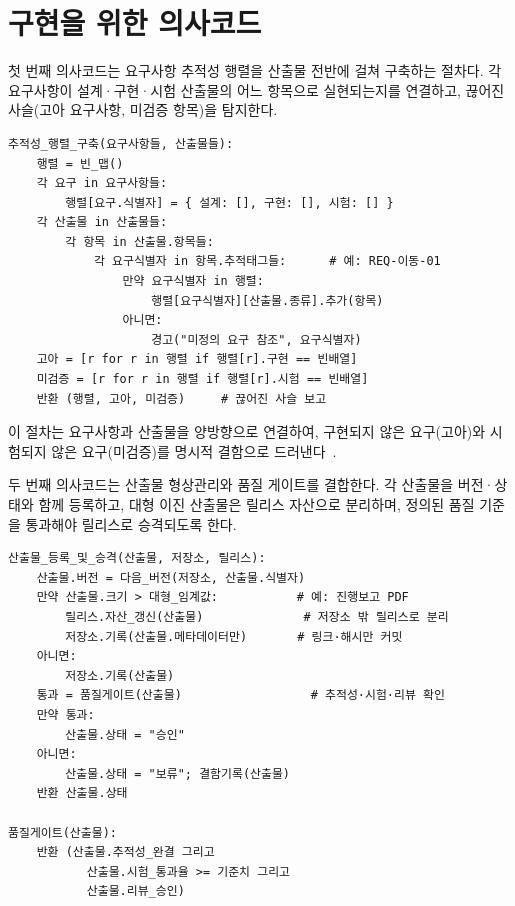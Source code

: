\section{구현을 위한 의사코드}

첫 번째 의사코드는 요구사항 추적성 행렬을 산출물 전반에 걸쳐 구축하는 절차다. 각 요구사항이 설계·구현·시험 산출물의 어느 항목으로 실현되는지를 연결하고, 끊어진 사슬(고아 요구사항, 미검증 항목)을 탐지한다.

\begin{verbatim}
추적성_행렬_구축(요구사항들, 산출물들):
    행렬 = 빈_맵()
    각 요구 in 요구사항들:
        행렬[요구.식별자] = { 설계: [], 구현: [], 시험: [] }
    각 산출물 in 산출물들:
        각 항목 in 산출물.항목들:
            각 요구식별자 in 항목.추적태그들:      # 예: REQ-이동-01
                만약 요구식별자 in 행렬:
                    행렬[요구식별자][산출물.종류].추가(항목)
                아니면:
                    경고("미정의 요구 참조", 요구식별자)
    고아 = [r for r in 행렬 if 행렬[r].구현 == 빈배열]
    미검증 = [r for r in 행렬 if 행렬[r].시험 == 빈배열]
    반환 (행렬, 고아, 미검증)     # 끊어진 사슬 보고
\end{verbatim}
이 절차는 요구사항과 산출물을 양방향으로 연결하여, 구현되지 않은 요구(고아)와 시험되지 않은 요구(미검증)를 명시적 결함으로 드러낸다~\cite{iso29119,mcconnell2004codecomplete}.

두 번째 의사코드는 산출물 형상관리와 품질 게이트를 결합한다. 각 산출물을 버전·상태와 함께 등록하고, 대형 이진 산출물은 릴리스 자산으로 분리하며, 정의된 품질 기준을 통과해야 릴리스로 승격되도록 한다.

\begin{verbatim}
산출물_등록_및_승격(산출물, 저장소, 릴리스):
    산출물.버전 = 다음_버전(저장소, 산출물.식별자)
    만약 산출물.크기 > 대형_임계값:           # 예: 진행보고 PDF
        릴리스.자산_갱신(산출물)              # 저장소 밖 릴리스로 분리
        저장소.기록(산출물.메타데이터만)       # 링크·해시만 커밋
    아니면:
        저장소.기록(산출물)
    통과 = 품질게이트(산출물)                  # 추적성·시험·리뷰 확인
    만약 통과:
        산출물.상태 = "승인"
    아니면:
        산출물.상태 = "보류"; 결함기록(산출물)
    반환 산출물.상태

품질게이트(산출물):
    반환 (산출물.추적성_완결 그리고
           산출물.시험_통과율 >= 기준치 그리고
           산출물.리뷰_승인)
\end{verbatim}


